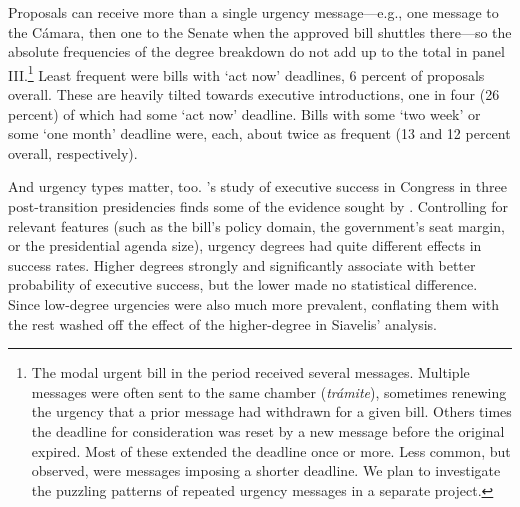 \documentclass[letter,12pt]{article}
\begin{document}
Proposals can receive more than a single urgency message---e.g., one message to the Cámara, then one to the Senate when the approved bill shuttles there---so the absolute frequencies of the degree breakdown do not add up to the total in panel III.\footnote{The modal urgent bill in the period received several messages. Multiple messages were often sent to the same chamber (\emph{trámite}), sometimes renewing the urgency that a prior message had withdrawn for a given bill. Others times the deadline for consideration was reset by a new message before the original expired. Most of these extended the deadline once or more. Less common, but observed, were messages imposing a shorter deadline. We plan to investigate the puzzling patterns of repeated urgency messages in a separate project.} Least frequent were bills with `act now' deadlines, 6 percent of proposals overall. These are heavily tilted towards executive introductions, one in four (26 percent) of which had some `act now' deadline. Bills with some `two week' or some `one month' deadline were, each, about twice as frequent (13 and 12 percent overall, respectively).


And urgency types matter, too. \citeauthor{aleman.navia.UrgChi.2009}'s \citeyearpar{aleman.navia.UrgChi.2009} study of executive success in Congress in three post-transition presidencies finds some of the evidence sought by \citet{siavelis.2002}. Controlling for relevant features (such as the bill's policy domain, the government's seat margin, or the presidential agenda size), urgency degrees had quite different effects in success rates. Higher degrees strongly and significantly associate with better probability of executive success, but the lower made no statistical difference. Since low-degree urgencies were also much more prevalent, conflating them with the rest washed off the effect of the higher-degree in Siavelis' analysis. 
\end{document}

